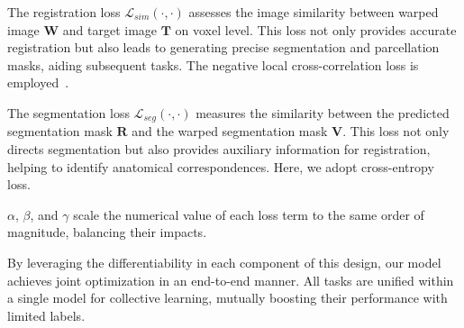 The registration loss $\mathcal{L}_{sim}(\cdot, \cdot)$ assesses the image similarity between warped image $\mathbf{W}$ and target image $\mathbf{T}$ on voxel level. This loss not only provides accurate registration but also leads to generating precise segmentation and parcellation masks, aiding subsequent tasks. The negative local cross-correlation loss is employed~\cite{balakrishnan2018unsupervised, zhao2019recursive}.

The segmentation loss $\mathcal{L}_{seg}(\cdot, \cdot)$ measures the similarity between the predicted segmentation mask $\mathbf{R}$ and the warped segmentation mask $\mathbf{V}$. This loss not only directs segmentation but also provides auxiliary information for registration, helping to identify anatomical correspondences. Here, we adopt cross-entropy loss.

$\alpha$, $\beta$, and $\gamma$ scale the numerical value of each loss term to the same order of magnitude, balancing their impacts. 

\fi

By leveraging the differentiability in each component of this design, our model achieves joint optimization in an end-to-end manner. All tasks are unified within a single model for collective learning, mutually boosting their performance with limited labels.
